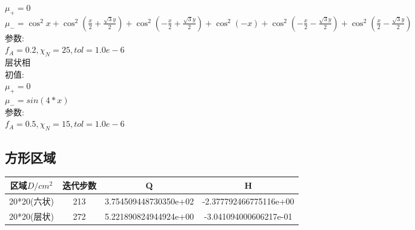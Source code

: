 \documentclass[12pt]{article}
\begin{document}
\begin{CJK}{UTF8}{gkai}
    $ \mu_+=0 $\\
    
    $ \mu_-=\cos^{2}x+\cos^2 (\frac{x}{2}+\frac{\sqrt{3}y}{2})+\cos^2(-\frac{x}{2}+\frac{\sqrt{3}y}{2})+\cos^{2}(-x)+\cos^2 (-\frac{x}{2}-\frac{\sqrt{3}y}{2})+\cos^2 (\frac{x}{2}-\frac{\sqrt{3}y}{2})$\\
   
    参数:\\
    
     $f_A=0.2,\chi_N=25,tol=1.0e-6$\\
     
     层状相\\
     
     初值:\\
    
    $ \mu_+=0 $\\
    
    $ \mu_-=sin(4*x)$\\

    参数:\\
    
     $f_A=0.5,\chi_N=15,tol=1.0e-6$\\
     \subsection{方形区域}
   
     \begin{table}[H]
     	\centering
     	    \begin{tabular}{cccc}
     	    	
     	    	\toprule
     	    	区域$D/cm^2$&迭代步数 & Q &  H \\
     	    	\midrule    20*20(六状)&213&3.754509448730350e+02&-2.377792466775116e+00\\
     	    	20*20(层状)&272& 5.221890824944924e+00 &-3.041094000606217e-01\\
     	    	\bottomrule
     	    \end{tabular}
     \end{table} 


\end{CJK}
\end{document}
